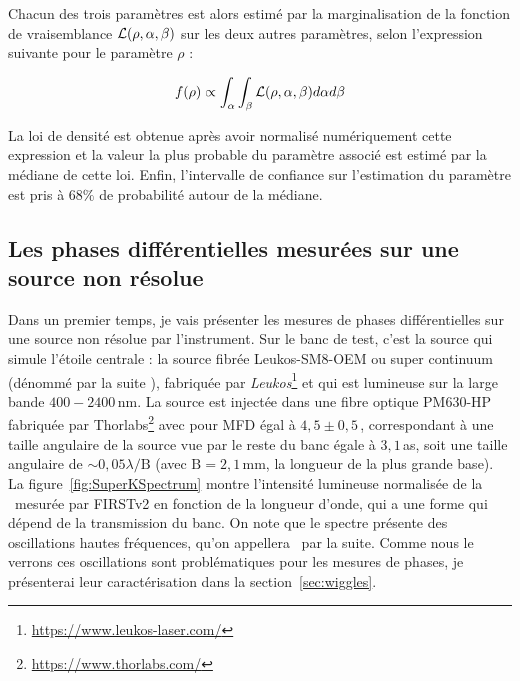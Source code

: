 Chacun des trois paramètres est alors estimé par la marginalisation de la fonction de vraisemblance $\mathcal{L} (\rho, \alpha, \beta)$ sur les deux autres paramètres, selon l'expression suivante pour le paramètre $\rho$ :

\begin{equation}
    f (\rho) \propto \int_{\alpha} \int_{\beta} \mathcal{L} (\rho, \alpha, \beta) d\alpha d\beta
\end{equation}

La loi de densité est obtenue après avoir normalisé numériquement cette expression et la valeur la plus probable du paramètre associé est estimé par la médiane de cette loi. Enfin, l'intervalle de confiance sur l'estimation du paramètre est pris à $68 \%$ de probabilité autour de la médiane.


\subsection{Les phases différentielles mesurées sur une source non résolue}

Dans un premier temps, je vais présenter les mesures de phases différentielles sur une source non résolue par l'instrument. Sur le banc de test, c'est la source qui simule l'étoile centrale : la source fibrée Leukos-SM8-OEM ou super continuum (dénommé par la suite \sk), fabriquée par \textit{Leukos}\footnote{\url{https://www.leukos-laser.com/}} et qui est lumineuse sur la large bande $400 - 2400 \,$nm. La source est injectée dans une fibre optique PM630-HP fabriquée par Thorlabs\footnote{\url{https://www.thorlabs.com/}} avec pour \ac{MFD} égal à $4,5 \pm 0,5 \,$\um, correspondant à une taille angulaire de la source vue par le reste du banc égale à $3,1 \,$as, soit une taille angulaire de $\sim 0,05 \lambda / \text{B}$ (avec $\text{B} = 2,1 \,$mm, la longueur de la plus grande base). La figure~\ref{fig:SuperKSpectrum} montre l'intensité lumineuse normalisée de la \sk~mesurée par \ac{FIRSTv2} en fonction de la longueur d'onde, qui a une forme qui dépend de la transmission du banc. On note que le spectre présente des oscillations hautes fréquences, qu'on appellera \wiggles~par la suite. Comme nous le verrons ces oscillations sont problématiques pour les mesures de phases, je présenterai leur caractérisation dans la section~\ref{sec:wiggles}.

